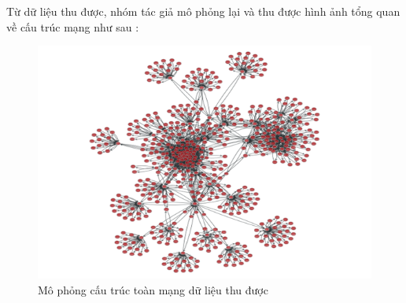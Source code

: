 \begin {itemize}
	 	Từ dữ liệu thu được, nhóm tác giả mô phỏng lại và thu được hình ảnh tổng quan về cấu trúc mạng như sau :
	 
	 	\begin{center}
	 		\begin{figure}[htp]
	 			\begin{center}
	 				\includegraphics [scale=.5]{picture/Hinh3_2}
	 			\end{center}
	 			\caption{Mô phỏng cấu trúc toàn mạng dữ liệu thu được}
	 			\label{refhinh3_2}
	 		\end{figure}
	 	\end{center}
 	\end {itemize}
